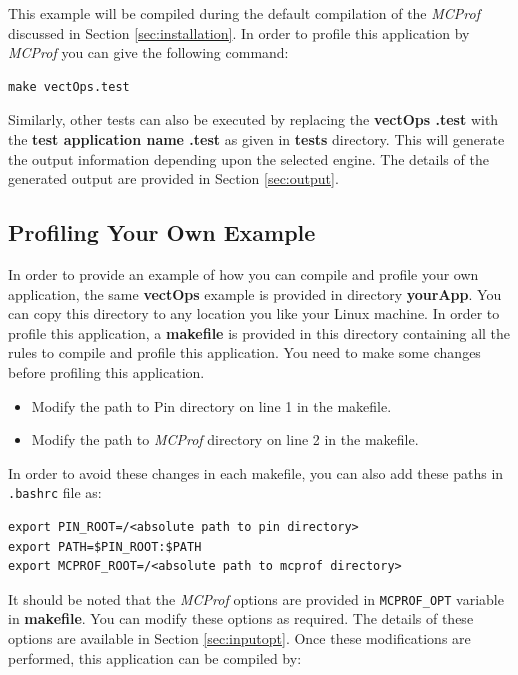 \documentclass[10pt]{article}
\newcommand{\MCPROF}{\emph{MCProf}}
\begin{document}
This example will be compiled during the default compilation of the \MCPROF{}
discussed in Section \ref{sec:installation}. In order to profile this
application by \MCPROF{} you can give the following command:

{
\small
\begin{Verbatim}[frame=single]
make vectOps.test
\end{Verbatim}
}

Similarly, other tests can also be executed by replacing the
\textbf{\textlangle vectOps \textrangle.test} with the
\textbf{\textlangle test application name \textrangle.test} as
given in \textbf{tests} directory. This will generate the output information
depending upon the selected engine. The details of the generated output are
provided in Section \ref{sec:output}.

\subsection{Profiling Your Own Example}

In order to provide an example of how you can compile and profile your own
application, the same \textbf{vectOps} example is provided in directory
\textbf{yourApp}. You can copy this directory to any location you like your
Linux machine. In order to profile this application, a \textbf{makefile} is
provided in this directory containing all the rules to compile and profile this
application. You need to make some changes before profiling this application.

\begin{itemize}
\item Modify the path to Pin directory on line 1 in the makefile.
\item Modify the path to \MCPROF{} directory on line 2 in the makefile.
\end{itemize}

In order to avoid these changes in each makefile, you can also add these paths
in \verb|.bashrc| file as:

{
\small
\begin{Verbatim}[frame=single]
export PIN_ROOT=/<absolute path to pin directory>
export PATH=$PIN_ROOT:$PATH
export MCPROF_ROOT=/<absolute path to mcprof directory>
\end{Verbatim}
}

It should be noted that the \MCPROF{} options are provided in \verb|MCPROF_OPT|
variable in \textbf{makefile}. You can modify these options as required. The
details of these options are available in Section \ref{sec:inputopt}. Once these
modifications are performed, this application can be compiled by:
\end{document}
